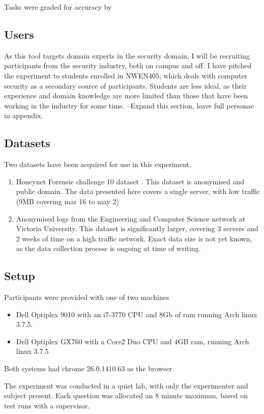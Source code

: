 Tasks were graded for accuracy by 

\subsection{Users}

As this tool targets domain experts in the security domain, I will be recruiting participants from the security industry, both on campus and off. I have pitched the experiment to students enrolled in NWEN405, which deals with computer security as a secondary source of participants. Students are less ideal, as their experience and domain knowledge are more limited than those that have been working in the industry for some time.
--Expand this section, leave full personae in appendix.

\subsection{Datasets}\label{data}

Two datasets have been acquired for use in this experiment.
\begin{enumerate}
\item{Honeynet Forensic challenge 10 dataset \cite{forensic10}. This dataset is anonymised and public domain. The data presented here covers a single server, with low traffic (9MB covering mar 16 to may 2)}
\item{Anonymised logs from the Engineering and Computer Science network at Victoria University. This dataset is significantly larger, covering 3 servers and 2 weeks of time on a high traffic network. Exact data size is not yet known, as the data collection process is ongoing at time of writing.}
\end{enumerate}

\subsection{Setup}
Participants were provided with one of two machines
\begin{itemize}
\item{Dell Optiplex 9010 with an i7-3770 CPU and 8Gb of ram running Arch linux 3.7.5.}
\item{Dell Optiplex GX760 with a Core2 Duo CPU and 4GB ram, running Arch linux 3.7.5}
\end{itemize}
Both systems had chrome 26.0.1410.63 as the browser.

The experiment was conducted in a quiet lab, with only the experimenter and subject present. Each question was allocated an 8 minute maximum, based on test runs with a supervisor.


